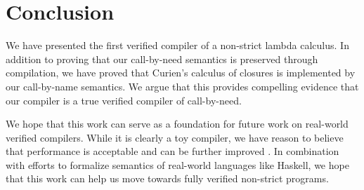 \section{Conclusion} \label{sec:conclusion}

We have presented the first verified compiler of a non-strict lambda calculus.
In addition to proving that our call-by-need semantics is preserved through
compilation, we have proved that Curien's calculus of closures is implemented by
our call-by-name semantics. We argue that this provides compelling evidence that
our compiler is a true verified compiler of call-by-need.

We hope that this work can serve as a foundation for future work on real-world
verified compilers. While it is clearly a toy compiler, we have reason to
believe that performance is acceptable and can be further improved \cite{cem}.
In combination with efforts to formalize semantics of real-world languages like
Haskell, we hope that this work can help us move towards fully verified
non-strict programs.
